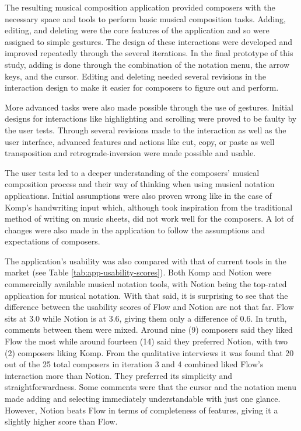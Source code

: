 		The resulting musical composition application provided composers with the necessary space and tools to perform basic musical composition tasks. Adding, editing, and deleting were the core features of the application and so were assigned to simple gestures. The design of these interactions were developed and improved repeatedly through the several iterations. In the final prototype of this study, adding is done through the combination of the notation menu, the arrow keys, and the cursor. Editing and deleting needed several revisions in the interaction design to make it easier for composers to figure out and perform. 

		More advanced tasks were also made possible through the use of gestures. Initial designs for interactions like highlighting and scrolling were proved to be faulty by the user tests. Through several revisions made to the interaction as well as the user interface, advanced features and actions like cut, copy, or paste as well transposition and retrograde-inversion were made possible and usable. 

		The user tests led to a deeper understanding of the composers' musical composition process and their way of thinking when using musical notation applications. Initial assumptions were also proven wrong like in the case of Komp's handwriting input which, although took inspiration from the traditional method of writing on music sheets, did not work well for the composers. A lot of changes were also made in the application to follow the assumptions and expectations of composers. 

		The application's usability was also compared with that of current tools in the market (see Table \ref{tab:app-usability-scores}). Both Komp and Notion were commercially available musical notation tools, with Notion being the top-rated application for musical notation. With that said, it is surprising to see that the difference between the usability scores of Flow and Notion are not that far. Flow sits at 3.0 while Notion is at 3.6, giving them only a difference of 0.6. In truth, comments between them were mixed. Around nine (9) composers said they liked Flow the most while around fourteen (14) said they preferred Notion, with two (2) composers liking Komp. From the qualitative interviews it was found that 20 out of the 25 total composers in iteration 3 and 4 combined liked Flow's interaction more than Notion. They preferred its simplicity and straightforwardness. Some comments were that the cursor and the notation menu made adding and selecting immediately understandable with just one glance. However, Notion beats Flow in terms of completeness of features, giving it a slightly higher score than Flow. 

